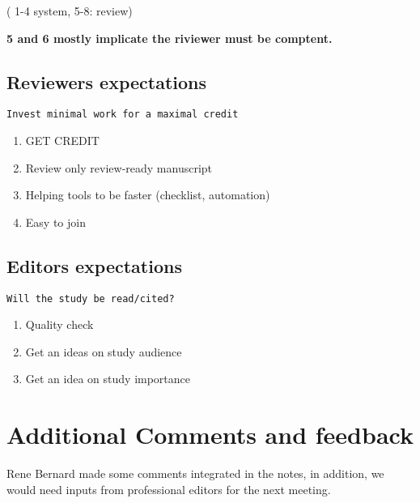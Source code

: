 \documentclass[]{article}
\begin{document}
( 1-4 system, 5-8: review)

\textbf{5 and 6 mostly implicate the riviewer must be comptent.}

\subsection{Reviewers expectations}\label{reviewers-expectations}

\begin{verbatim}
Invest minimal work for a maximal credit
\end{verbatim}

\begin{enumerate}
\def\labelenumi{\arabic{enumi}.}
\itemsep1pt\parskip0pt
\item
  GET CREDIT
\item
  Review only review-ready manuscript
\item
  Helping tools to be faster (checklist, automation)
\item
  Easy to join
\end{enumerate}

\subsection{Editors expectations}\label{editors-expectations}

\begin{verbatim}
Will the study be read/cited?
\end{verbatim}

\begin{enumerate}
\def\labelenumi{\arabic{enumi}.}
\itemsep1pt\parskip0pt
\item
  Quality check
\item
  Get an ideas on study audience
\item
  Get an idea on study importance
\end{enumerate}

\section{Additional Comments and
feedback}\label{additional-comments-and-feedback}

Rene Bernard made some comments integrated in the notes, in addition, we
would need inputs from professional editors for the next meeting.
\end{document}
